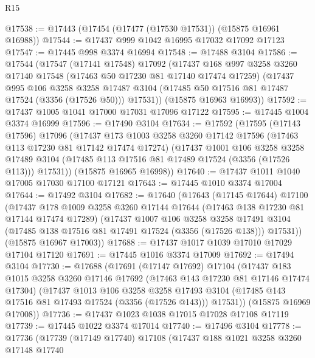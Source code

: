 \begin{lexlean}{R15}
\begin{coremodule}
@17538 := @17443 (@17454 (@17477 (@17530 @17531)) (@15875 @16961 @16988))
@17544 := @17437 @999 @1042 @16995 @17032 @17092 @17123
@17547 := @17445 @998 @3374 @16994
@17548 := @17488 @3104
@17586 := @17544
    (@17547
      (@17141 @17548)
      @17092
      (@17437
        @168
        @997
        @3258
        @3260
        @17140
        @17548
        (@17463 @50 @17230 @81 @17140 @17474 @17259)
        (@17437
          @995
          @106
          @3258
          @3258
          @17487
          @3104
          (@17485 @50 @17516 @81 @17487 @17524 (@3356 (@17526 @50)))
          @17531))
      (@15875 @16963 @16993))
@17592 := @17437 @1005 @1041 @17000 @17031 @17096 @17122
@17595 := @17445 @1004 @3374 @16999
@17596 := @17490 @3104
@17634 := @17592
    (@17595
      (@17143 @17596)
      @17096
      (@17437
        @173
        @1003
        @3258
        @3260
        @17142
        @17596
        (@17463 @113 @17230 @81 @17142 @17474 @17274)
        (@17437
          @1001
          @106
          @3258
          @3258
          @17489
          @3104
          (@17485 @113 @17516 @81 @17489 @17524 (@3356 (@17526 @113)))
          @17531))
      (@15875 @16965 @16998))
@17640 := @17437 @1011 @1040 @17005 @17030 @17100 @17121
@17643 := @17445 @1010 @3374 @17004
@17644 := @17492 @3104
@17682 := @17640
    (@17643
      (@17145 @17644)
      @17100
      (@17437
        @178
        @1009
        @3258
        @3260
        @17144
        @17644
        (@17463 @138 @17230 @81 @17144 @17474 @17289)
        (@17437
          @1007
          @106
          @3258
          @3258
          @17491
          @3104
          (@17485 @138 @17516 @81 @17491 @17524 (@3356 (@17526 @138)))
          @17531))
      (@15875 @16967 @17003))
@17688 := @17437 @1017 @1039 @17010 @17029 @17104 @17120
@17691 := @17445 @1016 @3374 @17009
@17692 := @17494 @3104
@17730 := @17688
    (@17691
      (@17147 @17692)
      @17104
      (@17437
        @183
        @1015
        @3258
        @3260
        @17146
        @17692
        (@17463 @143 @17230 @81 @17146 @17474 @17304)
        (@17437
          @1013
          @106
          @3258
          @3258
          @17493
          @3104
          (@17485 @143 @17516 @81 @17493 @17524 (@3356 (@17526 @143)))
          @17531))
      (@15875 @16969 @17008))
@17736 := @17437 @1023 @1038 @17015 @17028 @17108 @17119
@17739 := @17445 @1022 @3374 @17014
@17740 := @17496 @3104
@17778 := @17736
    (@17739
      (@17149 @17740)
      @17108
      (@17437
        @188
        @1021
        @3258
        @3260
        @17148
        @17740

\end{coremodule}
\end{lexlean}
